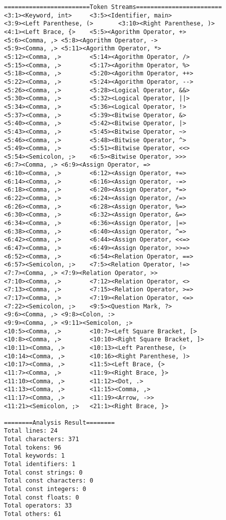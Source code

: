 \documentclass[lang=cn,11pt,a4paper]{paper}
\begin{document}
\begin{lstlisting}
========================Token Streams========================
<3:1><Keyword, int>     <3:5><Identifier, main>
<3:9><Left Parenthese, (>       <3:10><Right Parenthese, )>
<4:1><Left Brace, {>    <5:5><Agorithm Operator, +>
<5:6><Comma, ,> <5:8><Agorithm Operator, ->
<5:9><Comma, ,> <5:11><Agorithm Operator, *>
<5:12><Comma, ,>        <5:14><Agorithm Operator, />
<5:15><Comma, ,>        <5:17><Agorithm Operator, %>
<5:18><Comma, ,>        <5:20><Agorithm Operator, ++>
<5:22><Comma, ,>        <5:24><Agorithm Operator, -->
<5:26><Comma, ,>        <5:28><Logical Operator, &&>
<5:30><Comma, ,>        <5:32><Logical Operator, ||>
<5:34><Comma, ,>        <5:36><Logical Operator, !>
<5:37><Comma, ,>        <5:39><Bitwise Operator, &>
<5:40><Comma, ,>        <5:42><Bitwise Operator, |>
<5:43><Comma, ,>        <5:45><Bitwise Operator, ~>
<5:46><Comma, ,>        <5:48><Bitwise Operator, ^>
<5:49><Comma, ,>        <5:51><Bitwise Operator, <<>
<5:54><Semicolon, ;>    <6:5><Bitwise Operator, >>>
<6:7><Comma, ,> <6:9><Assign Operator, =>
<6:10><Comma, ,>        <6:12><Assign Operator, +=>
<6:14><Comma, ,>        <6:16><Assign Operator, -=>
<6:18><Comma, ,>        <6:20><Assign Operator, *=>
<6:22><Comma, ,>        <6:24><Assign Operator, /=>
<6:26><Comma, ,>        <6:28><Assign Operator, %=>
<6:30><Comma, ,>        <6:32><Assign Operator, &=>
<6:34><Comma, ,>        <6:36><Assign Operator, |=>
<6:38><Comma, ,>        <6:40><Assign Operator, ^=>
<6:42><Comma, ,>        <6:44><Assign Operator, <<=>
<6:47><Comma, ,>        <6:49><Assign Operator, >>=>
<6:52><Comma, ,>        <6:54><Relation Operator, ==>
<6:57><Semicolon, ;>    <7:5><Relation Operator, !=>
<7:7><Comma, ,> <7:9><Relation Operator, >>
<7:10><Comma, ,>        <7:12><Relation Operator, <>
<7:13><Comma, ,>        <7:15><Relation Operator, >=>
<7:17><Comma, ,>        <7:19><Relation Operator, <=>
<7:22><Semicolon, ;>    <9:5><Question Mark, ?>
<9:6><Comma, ,> <9:8><Colon, :>
<9:9><Comma, ,> <9:11><Semicolon, ;>
<10:5><Comma, ,>        <10:7><Left Square Bracket, [>
<10:8><Comma, ,>        <10:10><Right Square Bracket, ]>
<10:11><Comma, ,>       <10:13><Left Parenthese, (>
<10:14><Comma, ,>       <10:16><Right Parenthese, )>
<10:17><Comma, ,>       <11:5><Left Brace, {>
<11:7><Comma, ,>        <11:9><Right Brace, }>
<11:10><Comma, ,>       <11:12><Dot, .>
<11:13><Comma, ,>       <11:15><Comma, ,>
<11:17><Comma, ,>       <11:19><Arrow, ->>
<11:21><Semicolon, ;>   <21:1><Right Brace, }>

========Analysis Result========
Total lines: 24
Total characters: 371
Total tokens: 96
Total keywords: 1
Total identifiers: 1
Total const strings: 0
Total const characters: 0
Total const integers: 0
Total const floats: 0
Total operators: 33
Total others: 61
\end{lstlisting}
\end{document}
